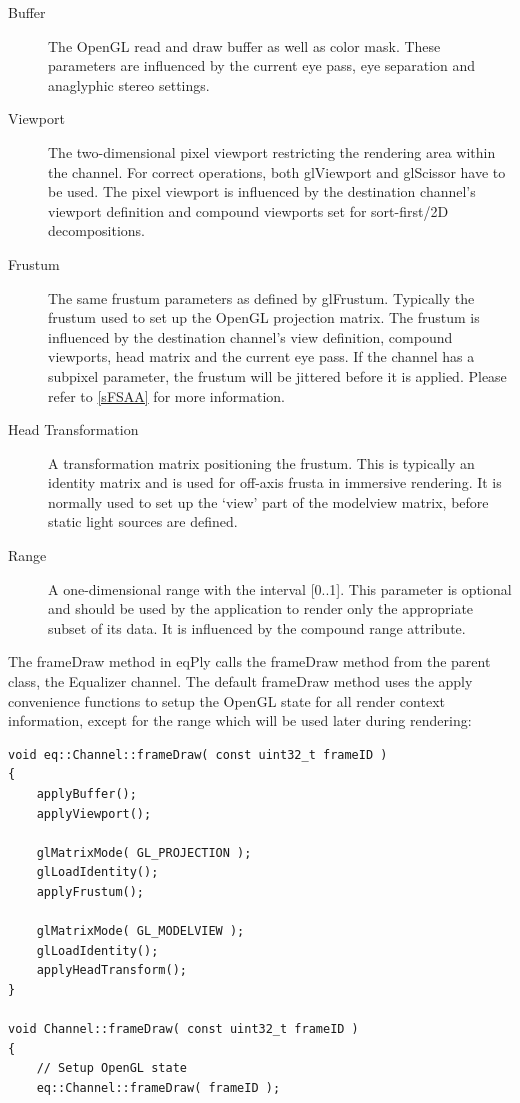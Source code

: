 \documentclass[10pt,a4]{scrartcl}
\begin{document}
\begin{description}
\item[Buffer] The OpenGL read and draw buffer as well as color mask.
  These parameters are influenced by the current eye pass, eye
  separation and anaglyphic stereo settings.
\item[Viewport] The two-dimensional pixel viewport restricting the
  rendering area within the channel. For correct operations, both
  \textsf{glViewport} and \textsf{glScissor} have to be used. The pixel
  viewport is influenced by the destination channel's viewport
  definition and compound viewports set for sort-first/2D decompositions.
\item[Frustum] The same frustum parameters as defined by
  \textsf{glFrustum}. Typically the frustum used to set up the OpenGL projection
  matrix. The frustum is influenced by the destination channel's view
  definition, compound viewports, head matrix and the current eye pass. If the
  channel has a subpixel parameter, the frustum will be jittered before it is
  applied. Please refer to \ref{sFSAA} for more information.
\item[Head Transformation] A transformation matrix positioning the
  frustum. This is typically an identity matrix and is used for off-axis
  frusta in immersive rendering. It is normally used to set up the
  `view' part of the modelview matrix, before static light sources are
  defined.
\item[Range] A one-dimensional range with the interval [0..1]. This
  parameter is optional and should be used by the application to render
  only the appropriate subset of its data. It is influenced by the
  compound range attribute.
\end{description}

The \textsf{frameDraw} method in \textsf{eqPly} calls the
\textsf{frameDraw} method from the parent class, the Equalizer
channel. The default \textsf{frameDraw} method uses the apply
convenience functions to setup the OpenGL state for all render context
information, except for the range which will be used later during
rendering:

{\footnotesize\begin{lstlisting}
void eq::Channel::frameDraw( const uint32_t frameID )
{
    applyBuffer();
    applyViewport();
    
    glMatrixMode( GL_PROJECTION );
    glLoadIdentity();
    applyFrustum();

    glMatrixMode( GL_MODELVIEW );
    glLoadIdentity();
    applyHeadTransform();
}

void Channel::frameDraw( const uint32_t frameID )
{
    // Setup OpenGL state
    eq::Channel::frameDraw( frameID );
\end{lstlisting}}
\end{document}
